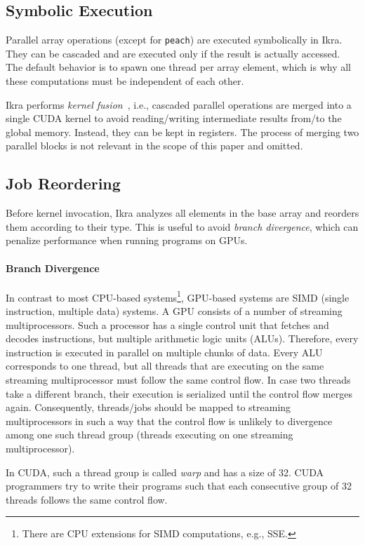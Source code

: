 \documentclass[preprint]{sigplanconf}
\begin{document}
\subsection{Symbolic Execution}
Parallel array operations (except for \texttt{peach}) are executed symbolically in Ikra. They can be cascaded and are executed only if the result is actually accessed. The default behavior is to spawn one thread per array element, which is why all these computations must be independent of each other. 

Ikra performs \emph{kernel fusion}~\cite{Wu:2012:KWA:2457472.2457490, Wahib:2014:SKF:2683593.2683615}, i.e., cascaded parallel operations are merged into a single CUDA kernel to avoid reading/writing intermediate results from/to the global memory. Instead, they can be kept in registers. The process of merging two parallel blocks is not relevant in the scope of this paper and omitted.

\subsection{Job Reordering}
Before kernel invocation, Ikra analyzes all elements in the base array and reorders them according to their type. This is useful to avoid \emph{branch divergence}, which can penalize performance when running programs on GPUs.

\paragraph{Branch Divergence}
In contrast to most CPU-based systems\footnote{There are CPU extensions for SIMD computations, e.g., SSE.}, GPU-based systems are SIMD (single instruction, multiple data) systems. A GPU consists of a number of streaming multiprocessors. Such a processor has a single control unit that fetches and decodes instructions, but multiple arithmetic logic units (ALUs). Therefore, every instruction is executed in parallel on multiple chunks of data. Every ALU corresponds to one thread, but all threads that are executing on the same streaming multiprocessor must follow the same control flow. In case two threads take a different branch, their execution is serialized until the control flow merges again. Consequently, threads/jobs should be mapped to streaming multiprocessors in such a way that the control flow is unlikely to divergence among one such thread group (threads executing on one streaming multiprocessor).

In CUDA, such a thread group is called \emph{warp} and has a size of 32. CUDA programmers try to write their programs such that each consecutive group of 32 threads follows the same control flow.
\end{document}
